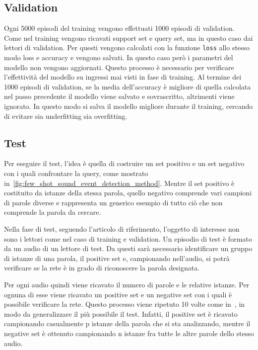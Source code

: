 \documentclass[12pt,a4paper,titlepage]{article}
\begin{document}
\subsection{Validation}
\label{subsec:proto_validation}
Ogni 5000 episodi del training vengono effettuati 1000 episodi di validation.
Come nel training vengono ricavati support set e query set, ma in questo caso dai lettori di validation.
Per questi vengono calcolati con la funzione \texttt{loss} allo stesso modo loss e accuracy e vengono salvati.
In questo caso però i parametri del modello non vengono aggiornati.
Questo processo è necessario per verificare l'effettività del modello su ingressi mai visti in fase di training.
Al termine dei 1000 episodi di validation, se la media dell'accuracy è migliore di quella calcolata nel passo precedente il modello viene salvato e sovrascritto, altrimenti viene ignorato. In questo modo si salva il modello migliore durante il training, cercando di evitare sia underfitting sia overfitting.


\subsection{Test}
\label{subsec:proto_test}
Per eseguire il test, l'idea è quella di costruire un set positivo e un set negativo con i quali confrontare la query, come mostrato in~\ref{fig:few_shot_sound_event_detection_method}. Mentre il set positivo è costituito da istanze della stessa parola, quello negativo comprende vari campioni di parole diverse e rappresenta un generico esempio di tutto ciò che non comprende la parola da cercare.

Nella fase di test, seguendo l'articolo di riferimento, l'oggetto di interesse non sono i lettori come nel caso di training e validation. Un episodio di test è formato da un audio di un lettore di test. Da questi sarà necessario identificare un gruppo di istanze di una parola, il positive set e, campionando nell'audio, si potrà verificare se la rete è in grado di riconoscere la parola designata.


Per ogni audio quindi viene ricavato il numero di parole e le relative istanze.
Per ognuna di esse viene ricavato un positive set e un negative set con i quali è possibile verificare la rete.
Questo processo viene ripetuto 10 volte come in~\cite{salamon:Few-Shot}, in modo da generalizzare il più possibile il test.
Infatti, il positive set è  ricavato campionando casualmente p istanze della parola che si sta analizzando, mentre il negative set è ottenuto campionando n istanze fra tutte le altre parole dello stesso audio.
\end{document}
